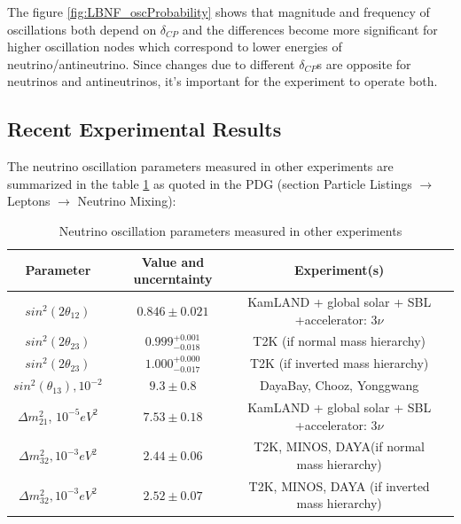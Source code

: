 The figure \ref{fig:LBNF_oscProbability} shows that magnitude and frequency of oscillations both depend on $\delta_{CP}$ and the differences become more significant for higher oscillation nodes which correspond to lower energies of neutrino/antineutrino. Since changes due to different $\delta_{CP}$s are opposite for neutrinos and antineutrinos, it's important for the experiment to operate both.\\

\subsection{Recent Experimental Results}
The neutrino oscillation parameters measured in other experiments are summarized in the table \ref{tab:MeasuredPars} as quoted in the PDG \cite{ref_PDG} (section Particle Listings $\rightarrow$ Leptons $\rightarrow$ Neutrino Mixing):\\
\begin{table}[h]
  \begin{center}
  \caption{ Neutrino oscillation parameters measured in other experiments}
  \begin{tabular}{|c|c|c|c|}
     Parameter & Value and uncerntainty & Experiment(s) \\ \hline
     $sin^2(2\theta_{12})$ &  $0.846\pm0.021$  &  KamLAND + global solar + SBL +accelerator: 3$\nu$  \\ \hline 
     $sin^2(2\theta_{23})$ &  $0.999^{+0.001}_{-0.018}$  &  T2K (if normal mass hierarchy)   \\ \hline 
     $sin^2(2\theta_{23})$ &  $1.000^{+0.000}_{-0.017}$  &  T2K (if inverted mass hierarchy)   \\ \hline 
     $sin^2(\theta_{13}), 10^{-2}$ &  $9.3\pm0.8$  &  DayaBay, Chooz, Yonggwang    \\ \hline 
     ${\Delta}m^2_{21}$, $10^{-5} eV^2$ &  $7.53\pm0.18$  &  KamLAND + global solar + SBL +accelerator: 3$\nu$   \\ \hline 
     ${\Delta}m^2_{32}, 10^{-3} eV^2$ &  $2.44\pm0.06$  &  T2K, MINOS, DAYA(if normal mass hierarchy)     \\ \hline
     ${\Delta}m^2_{32}, 10^{-3} eV^2$ &  $2.52\pm0.07$  &  T2K, MINOS, DAYA (if inverted mass hierarchy)     \\ \hline 
  \end{tabular}
  \label{tab:MeasuredPars}
  \end{center}
\end{table}

